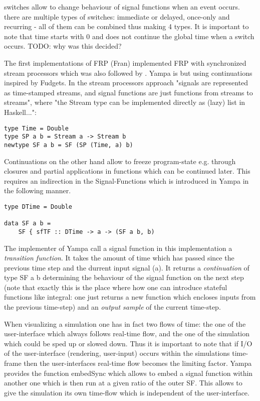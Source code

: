 switches allow to change behaviour of signal functions when an event occurs. there are multiple types of switches: immediate or delayed, once-only and recurring - all of them can be combined thus making 4 types. It is important to note that time starts with 0 and does not continue the global time when a switch occurs. TODO: why was this decided?

The first implementations of FRP (Fran) implemented FRP with synchronized stream processors which was also followed by \cite{wan_functional_2000}. Yampa is but using continuations inspired by Fudgets. In the stream processors approach "signals are represented as time-stamped streams, and signal functions are just functions from streams to streams", where "the Stream type can be implemented directly as (lazy) list in Haskell...":
\begin{lstlisting}[frame=single]
type Time = Double
type SP a b = Stream a -> Stream b
newtype SF a b = SF (SP (Time, a) b)
\end{lstlisting}
Continuations on the other hand allow to freeze program-state e.g. through closures and partial applications in functions which can be continued later. This requires an indirection in the Signal-Functions which is introduced in Yampa in the following manner. 
\begin{lstlisting}[frame=single]
type DTime = Double

data SF a b = 
	SF { sfTF :: DTime -> a -> (SF a b, b)
\end{lstlisting}
The implementer of Yampa call a signal function in this implementation a \textit{transition function}. It takes the amount of time which has passed since the previous time step and the durrent input signal (a). It returns a \textit{continuation} of type SF a b determining the behaviour of the signal function on the next step (note that exactly this is the place where how one can introduce stateful functions like integral: one just returns a new function which encloses inputs from the previous time-step) and an \textit{output sample} of the current time-step. 

When visualizing a simulation one has in fact two flows of time: the one of the user-interface which always follows real-time flow, and the one of the simulation which could be sped up or slowed down. Thus it is important to note that if I/O of the user-interface (rendering, user-input) occurs within the simulations time-frame then the user-interfaces real-time flow becomes the limiting factor. Yampa provides the function embedSync which allows to embed a signal function within another one which is then run at a given ratio of the outer SF. This allows to give the simulation its own time-flow which is independent of the user-interface. 
